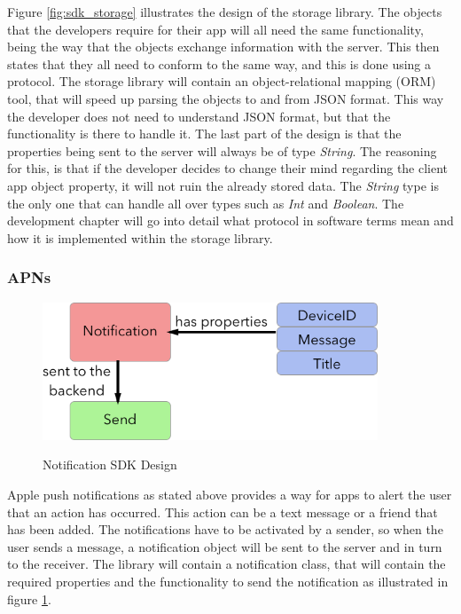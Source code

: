 Figure \ref{fig:sdk_storage} illustrates the design of the storage library. The objects that the developers require for their app will all need the same functionality, being the way that the objects exchange information with the server. This then states that they all need to conform to the same way, and this is done using a protocol. The storage library will contain an object-relational mapping (ORM) tool, that will speed up parsing the objects to and from JSON format. This way the developer does not need to understand JSON format, but that the functionality is there to handle it. The last part of the design is that the properties being sent to the server will always be of type \textit{String}. The reasoning for this, is that if the developer decides to change their mind regarding the client app object property, it will not ruin the already stored data. The \textit{String} type is the only one that can handle all over types such as \textit{Int} and \textit{Boolean}. The development chapter will go into detail what protocol in software terms mean and how it is implemented within the storage library. 

\subsubsection{APNs} \label{d-sdk:apns}

\begin{figure}[!h]
    \caption{Notification SDK Design}
    \centering
    \includegraphics[width=100mm]{images/design/notification}
    \label{fig:apns_storage}
\end{figure}

Apple push notifications as stated above provides a way for apps to alert the user that an action has occurred. This action can be a text message or a friend that has been added. The notifications have to be activated by a sender, so when the user sends a message, a notification object will be sent to the server and in turn to the receiver. The library will contain a notification class, that will contain the required properties and the functionality to send the notification as illustrated in figure \ref{fig:apns_storage}.

